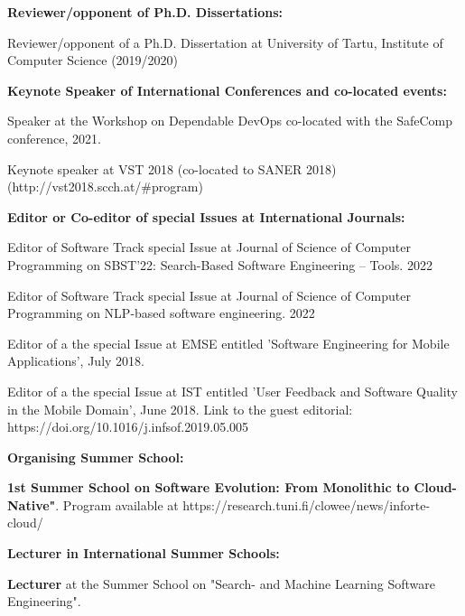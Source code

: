 \documentclass[10pt]{article}
\begin{document}
\textbf{Reviewer/opponent of Ph.D. Dissertations:}
\begin{innerlist}
\item Reviewer/opponent of a Ph.D. Dissertation  at University of Tartu, Institute of Computer Science (2019/2020) \\
	\end{innerlist}

\textbf{Keynote Speaker of International Conferences and co-located events:}
\begin{innerlist}
\item Speaker at the Workshop on Dependable DevOps co-located with the SafeComp conference, 2021.\\
\item Keynote speaker at VST 2018 (co-located to SANER 2018) \\(http://vst2018.scch.at/\#program) 
	\\
\end{innerlist}

\textbf{Editor or Co-editor of special Issues at International Journals:}
\begin{innerlist}
 \item Editor of Software Track special Issue at Journal of Science of Computer Programming on SBST’22: Search-Based Software Engineering – Tools. 2022
\item Editor of Software Track special Issue at Journal of Science of Computer Programming on NLP-based software engineering. 2022
\item Editor of a the special Issue at EMSE entitled 'Software Engineering for Mobile Applications', July 2018.
\item Editor of a the special Issue at IST entitled 'User Feedback and Software Quality in the Mobile Domain',  June 2018. Link to the guest editorial:\\ https://doi.org/10.1016/j.infsof.2019.05.005
	\\
\end{innerlist}

\textbf{Organising Summer School:}
\begin{innerlist}
\item \textbf{1st Summer School on Software Evolution: From Monolithic to Cloud-Native"}. Program available at https://research.tuni.fi/clowee/news/inforte-cloud/ 
	\\
\end{innerlist}

\textbf{Lecturer in International Summer Schools:}
\begin{innerlist}
\item \textbf{Lecturer} at the Summer School on "Search- and Machine Learning Software Engineering". 
\end{innerlist}
\end{document}
